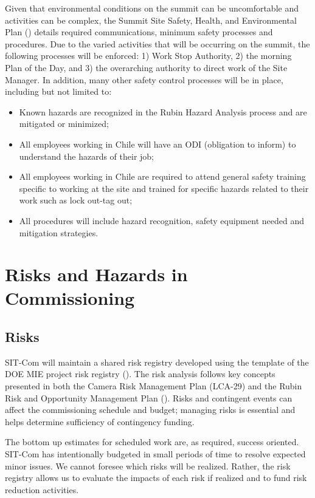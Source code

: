 \documentclass[SE,lsstdraft,authoryear,toc]{lsstdoc}
\begin{document}
Given that environmental conditions on the summit can be uncomfortable and activities can be complex, the Summit Site Safety, Health, and Environmental Plan () details required communications, minimum safety processes and procedures.
Due to the varied activities that will be occurring on the summit, the following processes will be enforced: 1) Work Stop Authority, 2) the morning Plan of the Day, and 3) the overarching authority to direct work of the Site Manager.  In addition, many other safety control processes will be in place, including but not limited to:
\begin{itemize}
    \item Known hazards are recognized in the Rubin Hazard Analysis process and are mitigated or minimized;
    \item All employees working in Chile will have an ODI (obligation to inform) to understand the hazards of their job;
    \item All employees working in Chile are required to attend general safety training specific to working at the site and trained for specific hazards related to their work such as lock out-tag out;
    \item All procedures will include hazard recognition, safety equipment needed and mitigation strategies.
\end{itemize}


\section{Risks and Hazards in Commissioning}
\subsection{Risks}
SIT-Com will maintain a shared risk registry developed using the template of the DOE MIE project risk registry ().
The risk analysis follows key concepts presented in both the Camera Risk Management Plan (LCA-29) and the Rubin Risk and Opportunity Management Plan ().
Risks and contingent events can affect the commissioning schedule and budget; managing risks is essential and helps determine sufficiency of contingency funding.

The bottom up estimates for scheduled work are, as required, success oriented.
SIT-Com has intentionally budgeted in small periods of time to resolve expected minor issues.
We cannot foresee which risks will be realized.
Rather, the risk registry allows us to evaluate the impacts of each risk if realized and to fund risk reduction activities.
\end{document}

